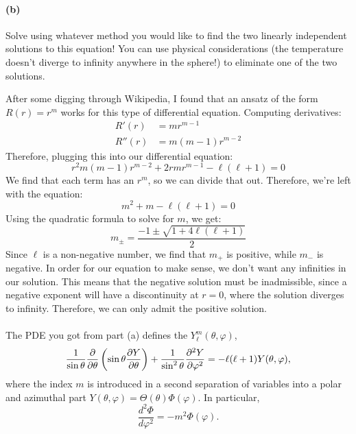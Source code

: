 \documentclass{article}
\begin{document}
\paragraph{(b)}		\extrapart
Solve using whatever method you would like to find the two linearly independent solutions to this equation!  You can use physical considerations (the temperature doesn't 
diverge to infinity anywhere in the sphere!) to eliminate one of the two solutions.

\begin{solution}
	After some digging through Wikipedia, I found that an ansatz of the form $R(r) = r^m$ works 
	for this type of differential equation. Computing derivatives:
	\begin{align*}
		R'(r) &= mr^{m-1}\\
		R''(r) &= m(m-1)r^{m-2}
	\end{align*} 
	Therefore, plugging this into our differential equation:
	\[
		r^2 m(m-1) r^{m-2} + 2r m r^{m-1} - \ell(\ell+1) = 0
	\] 
	We find that each term has an $r^m$, so we can divide that out. Therefore, we're left with the 
	equation:
	\[
	m^2 + m - \ell(\ell+1) = 0
	\] 
	Using the quadratic formula to solve for $m$, we get:
	\[
		m_{\pm} = \frac{-1 \pm \sqrt{1 + 4\ell(\ell+1)}}{2} 
	\] 
	Since $\ell$ is a non-negative number, we find that $m_+$ is positive, while $m_-$ is negative. In 
	order for our equation to make sense, we don't want any infinities in our solution. This means that the
	negative solution must 
	be inadmissible, since a negative exponent will have a discontinuity at $r = 0$, where the 
	solution diverges to infinity. Therefore, we can only admit the positive solution.
\end{solution}
\phline
\paragraph{}
The PDE you got from part (a) defines the  $Y_{\ell}^{m}(\theta,\varphi)$,
	\begin{equation*}
		\frac{1}{\sin\theta}\frac{\partial{}}{\partial{\theta}}\left(\sin\theta\frac{\partial{Y}}{\partial{\theta}}\right) 
			+ \frac{1}{\sin^{2}\theta}\frac{\partial^{2}{Y}}{\partial{\varphi}^{2}} = -\ell(\ell+1)Y(\theta,\varphi),
	\end{equation*}
where the index $m$ is introduced in a second separation of variables into a polar and azimuthal part $Y(\theta,\varphi) = \Theta(\theta)\Phi(\varphi)$.  In particular,
	\begin{equation*}
		\frac{d^{2}\Phi}{d\varphi^{2}} = -m^{2}\Phi(\varphi).
	\end{equation*}
\end{document}
